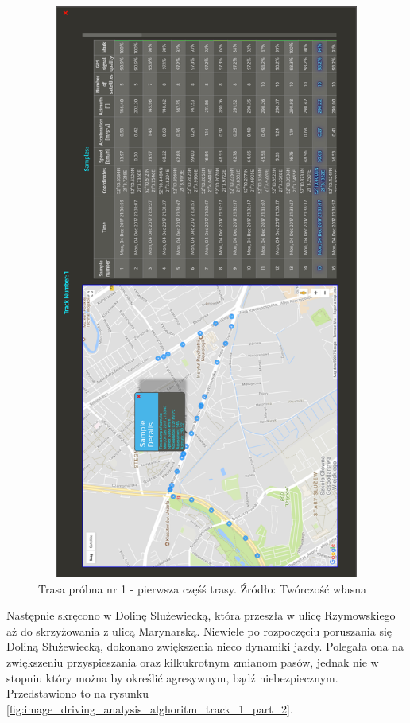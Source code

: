 \begin{figure}[H]
	\centering
	\includegraphics[height=19cm, width=13cm]{img/driving_analysis/test_track_1_lagodna.png}
	\caption{Trasa próbna nr 1 - pierwsza częśś trasy. Źródło: Twórczość własna}
	\label{fig:image_driving_analysis_alghoritm_track_1_part_1}
\end{figure}

Następnie skręcono w Dolinę Slużewiecką, która przeszła w ulicę Rzymowskiego aż do skrzyżowania z ulicą Marynarską. Niewiele po rozpoczęciu poruszania się Doliną Służewiecką, dokonano zwiększenia nieco dynamiki jazdy. Polegała ona na zwiększeniu przyspieszania oraz kilkukrotnym zmianom pasów, jednak nie w stopniu który można by określić agresywnym, bądź niebezpiecznym. Przedstawiono to na rysunku \ref{fig:image_driving_analysis_alghoritm_track_1_part_2}.

